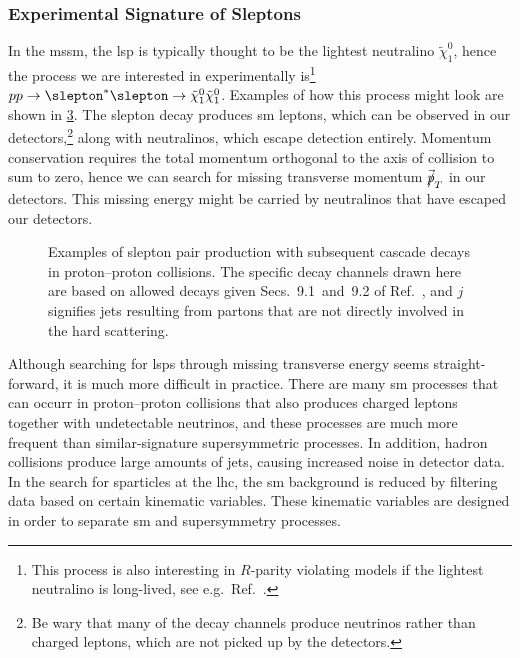 \subsubsection{Experimental Signature of Sleptons}
In the \gls{mssm}, the \gls{lsp} is typically thought to be the lightest neutralino $\tilde\chi_1^0$, hence the process we are interested in experimentally is\footnote{This process is also interesting in $R$-parity violating models if the lightest neutralino is long-lived, see e.g.\ Ref.~\cite{Cottin:2025avd}.} $pp \to \slepton^*\slepton \to \tilde\chi_1^0\tilde\chi_1^0$.
Examples of how this process might look are shown in \cref{fig:pp_to_neutralino}.
The slepton decay produces \gls{sm} leptons, which can be observed in our detectors,\footnote{Be wary that many of the decay channels produce neutrinos rather than charged leptons, which are not picked up by the detectors.} along with neutralinos, which escape detection entirely.
Momentum conservation requires the total momentum orthogonal to the axis of collision to sum to zero, hence we can search for missing transverse momentum $\vec{\slashed{p}}_T$ in our detectors.
This missing energy might be carried by neutralinos that have escaped our detectors.

\begin{figure}
    \centering
    \begin{subfigure}[b]{0.35\linewidth}
        \centering
        \caption{}
        \label{fig:pp_to_neutralino_simple}
    \end{subfigure}
    \begin{subfigure}[b]{0.6\linewidth}
        \centering
        \caption{}
        \label{fig:pp_to_neutralino_cascade}
    \end{subfigure}
    \caption{Examples of slepton pair production with subsequent cascade decays in proton--proton collisions. The specific decay channels drawn here are based on allowed decays given Secs.~9.1~and~9.2 of Ref.~\cite{Martin:1997ns}, and $j$ signifies jets resulting from partons that are not directly involved in the hard scattering.}
    \label{fig:pp_to_neutralino}
\end{figure}

Although searching for \glspl{lsp} through missing transverse energy seems straight-forward, it is much more difficult in practice.
There are many \gls{sm} processes that can occurr in proton--proton collisions that also produces charged leptons together with undetectable neutrinos, and these processes are much more frequent than similar-signature supersymmetric processes.
In addition, hadron collisions produce large amounts of jets, causing increased noise in detector data.
In the search for sparticles at the \gls{lhc}, the \gls{sm} background is reduced by filtering data based on certain kinematic variables.
These kinematic variables are designed in order to separate \gls{sm} and supersymmetry processes.

